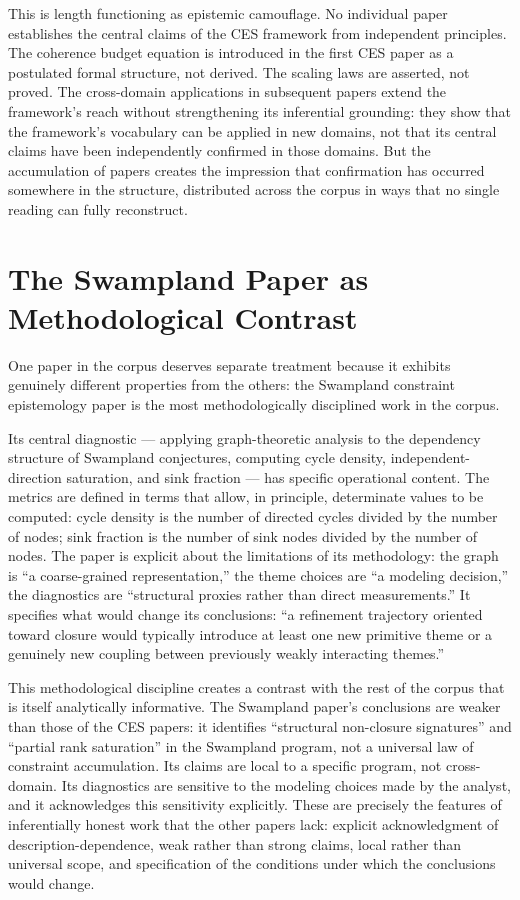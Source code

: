 \documentclass[12pt, openright, twoside]{book}
\begin{document}
This is length functioning as epistemic camouflage. No individual paper
establishes the central claims of the CES framework from independent principles.
The coherence budget equation is introduced in the first CES paper as a
postulated formal structure, not derived. The scaling laws are asserted, not
proved. The cross-domain applications in subsequent papers extend the framework's
reach without strengthening its inferential grounding: they show that the
framework's vocabulary can be applied in new domains, not that its central
claims have been independently confirmed in those domains. But the accumulation
of papers creates the impression that confirmation has occurred somewhere in
the structure, distributed across the corpus in ways that no single reading
can fully reconstruct.

\section{The Swampland Paper as Methodological Contrast}

One paper in the corpus deserves separate treatment because it exhibits
genuinely different properties from the others: the Swampland constraint
epistemology paper is the most methodologically disciplined work in the corpus.

Its central diagnostic --- applying graph-theoretic analysis to the dependency
structure of Swampland conjectures, computing cycle density, independent-direction
saturation, and sink fraction --- has specific operational content. The metrics
are defined in terms that allow, in principle, determinate values to be computed:
cycle density is the number of directed cycles divided by the number of nodes;
sink fraction is the number of sink nodes divided by the number of nodes. The
paper is explicit about the limitations of its methodology: the graph is ``a
coarse-grained representation,'' the theme choices are ``a modeling decision,''
the diagnostics are ``structural proxies rather than direct measurements.''
It specifies what would change its conclusions: ``a refinement trajectory
oriented toward closure would typically introduce at least one new primitive
theme or a genuinely new coupling between previously weakly interacting themes.''

This methodological discipline creates a contrast with the rest of the corpus
that is itself analytically informative. The Swampland paper's conclusions
are weaker than those of the CES papers: it identifies ``structural non-closure
signatures'' and ``partial rank saturation'' in the Swampland program, not
a universal law of constraint accumulation. Its claims are local to a specific
program, not cross-domain. Its diagnostics are sensitive to the modeling choices
made by the analyst, and it acknowledges this sensitivity explicitly. These
are precisely the features of inferentially honest work that the other papers
lack: explicit acknowledgment of description-dependence, weak rather than
strong claims, local rather than universal scope, and specification of the
conditions under which the conclusions would change.
\end{document}

